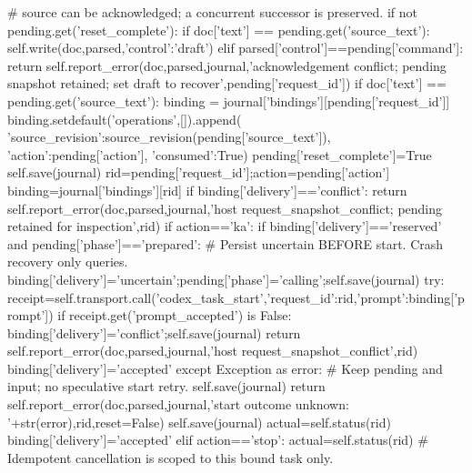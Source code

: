                 # source can be acknowledged; a concurrent successor is preserved.
                if not pending.get('reset_complete'):
                    if doc['text'] == pending.get('source_text'):
                        self.write(doc,parsed,{'control':'draft\n'})
                    elif parsed['control']==pending['command']:
                        return self.report_error(doc,parsed,journal,'acknowledgement conflict; pending snapshot retained; set draft to recover',pending['request_id'])
                    if doc['text'] == pending.get('source_text'):
                        binding = journal['bindings'][pending['request_id']]
                        binding.setdefault('operations',[]).append({
                            'source_revision':source_revision(pending['source_text']),
                            'action':pending['action'], 'consumed':True})
                    pending['reset_complete']=True
                    self.save(journal)
                rid=pending['request_id'];action=pending['action']
                binding=journal['bindings'][rid]
                if binding['delivery']=='conflict':
                    return self.report_error(doc,parsed,journal,'host request_snapshot_conflict; pending retained for inspection',rid)
                if action=='ka':
                    if binding['delivery']=='reserved' and pending['phase']=='prepared':
                        # Persist uncertain BEFORE start. Crash recovery only queries.
                        binding['delivery']='uncertain';pending['phase']='calling';self.save(journal)
                        try:
                            receipt=self.transport.call('codex_task_start',{'request_id':rid,'prompt':binding['prompt']})
                            if receipt.get('prompt_accepted') is False:
                                binding['delivery']='conflict';self.save(journal)
                                return self.report_error(doc,parsed,journal,'host request_snapshot_conflict',rid)
                            binding['delivery']='accepted'
                        except Exception as error:
                            # Keep pending and input; no speculative start retry.
                            self.save(journal)
                            return self.report_error(doc,parsed,journal,'start outcome unknown: '+str(error),rid,reset=False)
                        self.save(journal)
                    actual=self.status(rid)
                    binding['delivery']='accepted'
                elif action=='stop':
                    actual=self.status(rid)
                    # Idempotent cancellation is scoped to this bound task only.
